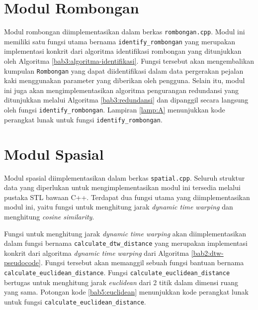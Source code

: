 \section{Modul Rombongan}
\label{sec:impl-rombongan}

Modul rombongan diimplementasikan dalam berkas \texttt{rombongan.cpp}. Modul ini memiliki satu fungsi utama bernama \texttt{identify\_rombongan} yang merupakan implementasi konkrit dari algoritma identifikasi rombongan yang ditunjukkan oleh Algoritma \ref{bab3:algoritma-identifikasi}. Fungsi tersebut akan mengembalikan kumpulan \texttt{Rombongan} yang dapat diidentifikasi dalam data pergerakan pejalan kaki menggunakan parameter yang diberikan oleh pengguna. Selain itu, modul ini juga akan mengimplementasikan algoritma pengurangan redundansi yang ditunjukkan melalui Algoritma \ref{bab3:redundansi} dan dipanggil secara langsung oleh fungsi \texttt{identify\_rombongan}. Lampiran \ref{lamp:A} menunjukkan kode perangkat lunak untuk fungsi \texttt{identify\_rombongan}.

\section{Modul Spasial}

Modul spasial diimplementasikan dalam berkas \texttt{spatial.cpp}. Seluruh struktur data yang diperlukan untuk mengimplementasikan modul ini tersedia melalui pustaka STL bawaan C++. Terdapat dua fungsi utama yang diimplementasikan modul ini, yaitu fungsi untuk menghitung jarak \textit{dynamic time warping} dan menghitung \textit{cosine similarity}.

Fungsi untuk menghitung jarak \textit{dynamic time warping} akan diimplementasikan dalam fungsi bernama \texttt{calculate\_dtw\_distance} yang merupakan implementasi konkrit dari algoritma \textit{dynamic time warping} dari Algoritma \ref{bab2:dtw-pseudocode}. Fungsi tersebut akan memanggil sebuah fungsi bantuan bernama \texttt{calculate\_euclidean\_distance}. Fungsi \texttt{calculate\_euclidean\_distance} bertugas untuk menghitung jarak \textit{euclidean} dari 2 titik dalam dimensi ruang yang sama. Potongan kode \ref{bab5:euclidean} menunjukkan kode perangkat lunak untuk fungsi \texttt{calculate\_euclidean\_distance}.

